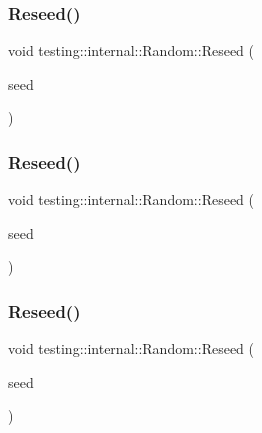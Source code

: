 \mbox{\label{classtesting_1_1internal_1_1_random_adf2f24199318a46f885c78f50d89a69e}} 
\subsubsection{\texorpdfstring{Reseed()}{Reseed()}\hspace{0.1cm}{\footnotesize\ttfamily [1/3]}}
{\footnotesize\ttfamily void testing\+::internal\+::\+Random\+::\+Reseed (\begin{DoxyParamCaption}\item[{\mbox{\hyperlink{namespacetesting_1_1internal_a436defbb8e92c8e94e33ebcc86f278ba}{U\+Int32}}}]{seed }\end{DoxyParamCaption})\hspace{0.3cm}{\ttfamily [inline]}}

\mbox{\label{classtesting_1_1internal_1_1_random_adf2f24199318a46f885c78f50d89a69e}} 
\subsubsection{\texorpdfstring{Reseed()}{Reseed()}\hspace{0.1cm}{\footnotesize\ttfamily [2/3]}}
{\footnotesize\ttfamily void testing\+::internal\+::\+Random\+::\+Reseed (\begin{DoxyParamCaption}\item[{\mbox{\hyperlink{namespacetesting_1_1internal_a436defbb8e92c8e94e33ebcc86f278ba}{U\+Int32}}}]{seed }\end{DoxyParamCaption})\hspace{0.3cm}{\ttfamily [inline]}}

\mbox{\label{classtesting_1_1internal_1_1_random_adf2f24199318a46f885c78f50d89a69e}} 
\subsubsection{\texorpdfstring{Reseed()}{Reseed()}\hspace{0.1cm}{\footnotesize\ttfamily [3/3]}}
{\footnotesize\ttfamily void testing\+::internal\+::\+Random\+::\+Reseed (\begin{DoxyParamCaption}\item[{\mbox{\hyperlink{namespacetesting_1_1internal_a436defbb8e92c8e94e33ebcc86f278ba}{U\+Int32}}}]{seed }\end{DoxyParamCaption})\hspace{0.3cm}{\ttfamily [inline]}}



